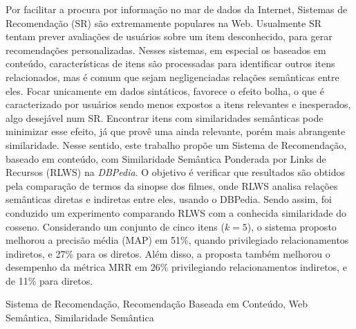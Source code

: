 Por facilitar a procura por informação no mar de dados da Internet, Sistemas de Recomendação (SR) são extremamente populares na Web. Usualmente SR tentam prever avaliações de usuários sobre um item desconhecido, para gerar recomendações personalizadas. Nesses sistemas, em especial os baseados em conteúdo, características de itens são processadas para identificar outros itens relacionados, mas é comum que sejam negligenciadas relações semânticas entre eles. Focar unicamente em dados sintáticos, favorece o efeito bolha, o que é caracterizado por usuários sendo menos expostos a itens relevantes e inesperados, algo desejável num SR. Encontrar itens com similaridades semânticas pode minimizar esse efeito, já que provê uma ainda relevante, porém mais abrangente similaridade. Nesse sentido, este trabalho propõe um Sistema de Recomendação, baseado em conteúdo, com Similaridade Semântica Ponderada por Links de Recursos (RLWS) na \textit{DBPedia}. O objetivo é verificar que resultados são obtidos pela comparação de termos da sinopse dos filmes, onde RLWS analisa relações semânticas diretas e indiretas entre eles, usando o DBPedia. Sendo assim, foi conduzido um experimento comparando RLWS com a conhecida similaridade do cosseno. Considerando um conjunto de cinco itens ($k=5$), o sistema proposto melhorou a precisão média (MAP) em 51\%, quando privilegiado relacionamentos indiretos, e 27\% para os diretos. Além disso, a proposta também melhorou o desempenho da métrica MRR em 26\% privilegiando relacionamentos indiretos, e de 11\% para diretos.

\begin{keywords}
	Sistema de Recomendação, Recomendação Baseada em Conteúdo, Web Semântica, Similaridade Semântica
\end{keywords}